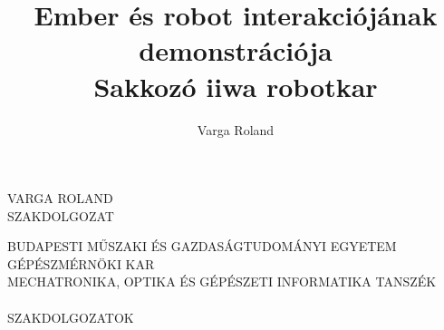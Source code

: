 \documentclass[12pt,a4paper,twoside]{article}
\begin{document}
\author{Varga Roland}
\title{Ember és robot interakciójának demonstrációja\\
		Sakkozó iiwa robotkar}
\newpage\thispagestyle{empty}
\begin{center}
     VARGA ROLAND\\
     SZAKDOLGOZAT
\end{center}
\newpage\thispagestyle{empty}
\begin{center}
     BUDAPESTI MŰSZAKI ÉS GAZDASÁGTUDOMÁNYI EGYETEM\\
     GÉPÉSZMÉRNÖKI KAR\\
     MECHATRONIKA, OPTIKA ÉS GÉPÉSZETI INFORMATIKA TANSZÉK\\[1ex]
     \\[1ex]
     SZAKDOLGOZATOK
\end{center}
\newpage\thispagestyle{plain}
\end{document}
